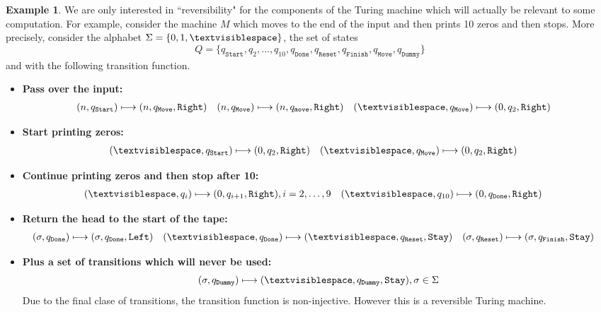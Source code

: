 \documentclass[12pt]{article}
\theoremstyle{plain}
\theoremstyle{definition}
\newtheorem{example}[thm]{Example}
\newcommand{\blank}{\textvisiblespace}
\begin{document}
	\begin{example}
		\item We are only interested in ``reversibility" for the components of the Turing machine which will actually be relevant to some computation. For example, consider the machine $M$ which moves to the end of the input and then prints 10 zeros and then stops. More precisely, consider the alphabet $\Sigma = \{0, 1, \blank\}$, the set of states 
		\begin{equation}
			Q = \{q_{\texttt{Start}}, q_2, \ldots, q_{10}, q_{\texttt{Done}}, q_{\texttt{Reset}}, q_{\texttt{Finish}}, q_{\texttt{Move}},q_{\texttt{Dummy}}\}
		\end{equation}
		and with the following transition function.
		\begin{itemize}
			\item \textbf{Pass over the input:}
			\begin{align*}
				(n, q_{\texttt{Start}}) &\longmapsto (n, q_{\texttt{Move}}, \texttt{Right}) & (n, q_{\texttt{Move}}) &\longmapsto (n, q_{\texttt{move}}, \texttt{Right}) & (\blank, q_{\texttt{Move}}) &\longmapsto (0, q_{2}, \texttt{Right})
			\end{align*}
			\item \textbf{Start printing zeros: }
			\begin{align*}
				(\blank, q_{\texttt{Start}}) &\longmapsto (0, q_2, \texttt{Right}) & (\blank, q_{\texttt{Move}}) &\longmapsto (0, q_2, \texttt{Right})
			\end{align*}
			\item \textbf{Continue printing zeros and then stop after 10:}
			\begin{align*}
				(\blank, q_{i}) &\longmapsto (0, q_{i+1}, \texttt{Right}), i = 2,\ldots, 9 & (\blank, q_{10}) &\longmapsto (0, q_{\texttt{Done}}, \texttt{Right})
			\end{align*}
			\item \textbf{Return the head to the start of the tape:}
			\begin{align*}
				(\sigma, q_{\texttt{Done}}) &\longmapsto (\sigma, q_{\texttt{Done}}, \texttt{Left}) & (\blank, q_{\texttt{Done}}) &\longmapsto (\blank, q_{\texttt{Reset}}, \texttt{Stay}) & (\sigma, q_{\texttt{Reset}}) &\longmapsto (\sigma, q_{\texttt{Finish}}, \texttt{Stay})
			\end{align*}
			\item \textbf{Plus a set of transitions which will never be used: }
			\begin{equation}
				(\sigma, q_{\texttt{Dummy}}) \longmapsto (\blank, q_{\texttt{Dummy}}, \texttt{Stay}), \sigma \in \Sigma
			\end{equation}
		Due to the final clase of transitions, the transition function is non-injective. However this is a reversible Turing machine.
		\end{itemize}
	\end{example}
\end{document}
